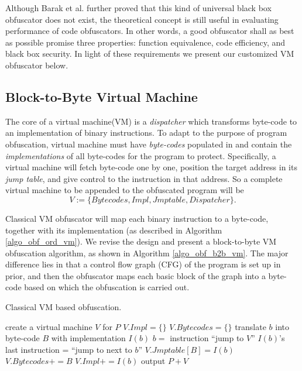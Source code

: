 \documentclass{../style/llncs}                   %
\begin{document}
Although Barak et al. \cite{barak01} further proved that this kind of universal black box
obfuscator does not exist, the theoretical concept
is still useful in evaluating performance of code obfuscators.
In other words, a good obfuscator shall as best as possible promise three properties:
function equivalence, code efficiency, and black box security.
In light of these requirements we present our customized VM obfuscator below.



\subsection{Block-to-Byte Virtual Machine}


The core of a virtual machine(VM) is a \emph{dispatcher} which transforms byte-code
to an implementation of binary instructions.
To adapt to the purpose of program obfuscation,
virtual machine must have \emph{byte-codes} populated in and contain
the \emph{implementations} of all byte-codes
for the program to protect. Specifically, a virtual machine will fetch byte-code
one by one, position the target address in its \emph{jump table}, and give
control to the instruction in that address.
So a complete virtual machine to be appended to the
obfuscated program will be
\[
    V:= \{ Bytecodes, Impl, Jmptable, Dispatcher
    \}.
\]

Classical VM obfuscator will map each binary instruction to a byte-code,
together with its implementation (as described in Algorithm \ref{algo_obf_ord_vm}).
We revise the design and present a block-to-byte VM obfuscation algorithm,
as shown in Algorithm \ref{algo_obf_b2b_vm}. The major difference lies in that
a control flow graph (CFG) of the program is set up in prior, and then the
obfuscator maps each basic block of the graph into a byte-code based on which
the obfuscation is carried out.

\begin{algorithm}
\caption{Classical VM based obfuscation.}
\label{algo_obf_ord_vm}
  create a virtual machine $V$ for $P$\;
  $V.Impl =\{\}$\;
  $V.Bytecodes =\{\}$\;
  {
     translate $b$ into byte-code $B$ with implementation $I(b)$\;
     $b=$ instruction ``jump to $V$''\;
     $I(b)$'s last instruction = ``jump to next to $b$''\;
     $V.Jmptable[B] = I(b)$\;
     $V.Bytecodes += B$\;
     $V.Impl += I(b)$\;
  }
  output $P+V$\;
\end{algorithm}
\end{document}
